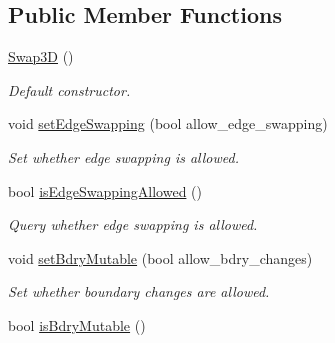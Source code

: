 \subsection*{Public Member Functions}
\begin{DoxyCompactItemize}
\item 
\hyperlink{class_i_t_a_p_s___swap_1_1_swap3_d_acf6445ad45f957369eb20b0671bfd5ba}{Swap3D} ()
\begin{DoxyCompactList}\small\item\em Default constructor. \item\end{DoxyCompactList}\item 
\hypertarget{class_i_t_a_p_s___swap_1_1_swap3_d_a2122e59297538a3489eeb3dd74a2d482}{
void \hyperlink{class_i_t_a_p_s___swap_1_1_swap3_d_a2122e59297538a3489eeb3dd74a2d482}{setEdgeSwapping} (bool allow\_\-edge\_\-swapping)}
\label{class_i_t_a_p_s___swap_1_1_swap3_d_a2122e59297538a3489eeb3dd74a2d482}

\begin{DoxyCompactList}\small\item\em Set whether edge swapping is allowed. \item\end{DoxyCompactList}\item 
\hypertarget{class_i_t_a_p_s___swap_1_1_swap3_d_a4ce9a3eb26e6be61d006f51fa8720999}{
bool \hyperlink{class_i_t_a_p_s___swap_1_1_swap3_d_a4ce9a3eb26e6be61d006f51fa8720999}{isEdgeSwappingAllowed} ()}
\label{class_i_t_a_p_s___swap_1_1_swap3_d_a4ce9a3eb26e6be61d006f51fa8720999}

\begin{DoxyCompactList}\small\item\em Query whether edge swapping is allowed. \item\end{DoxyCompactList}\item 
\hypertarget{class_i_t_a_p_s___swap_1_1_swap3_d_afe3ed257e355aaac22b281a24b35637c}{
void \hyperlink{class_i_t_a_p_s___swap_1_1_swap3_d_afe3ed257e355aaac22b281a24b35637c}{setBdryMutable} (bool allow\_\-bdry\_\-changes)}
\label{class_i_t_a_p_s___swap_1_1_swap3_d_afe3ed257e355aaac22b281a24b35637c}

\begin{DoxyCompactList}\small\item\em Set whether boundary changes are allowed. \item\end{DoxyCompactList}\item 
\hypertarget{class_i_t_a_p_s___swap_1_1_swap3_d_a59dfdb2933f976acb278d6849ab8f90e}{
bool \hyperlink{class_i_t_a_p_s___swap_1_1_swap3_d_a59dfdb2933f976acb278d6849ab8f90e}{isBdryMutable} ()}
\label{class_i_t_a_p_s___swap_1_1_swap3_d_a59dfdb2933f976acb278d6849ab8f90e}


\end{DoxyCompactItemize}
